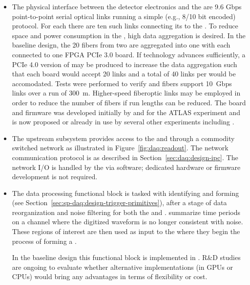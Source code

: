\begin{itemize}
  
  \item The physical interface between the detector electronics and the  are 9.6 Gbps
point-to-point serial optical links running a simple (e.g., 8/10 bit encoded) protocol.  For each
 there are ten such links connecting its  to the . To reduce space and
power consumption in the , high data aggregation is desired. In the baseline design, the
20 fibers from two  are aggregated into one  with each  connected
to one  FPGA PCIe 3.0 board.  If technology advances sufficiently, a PCIe 4.0 version of
 may be produced to increase the data aggregation such that each board would accept 20
links and a total of 40 links per  would be accomodated. Tests were performed to verify
 and  fibers support \SI{10}{Gbps} links over a run of \SI{300}{\meter}.
Higher-speed fiberoptic links may be employed in order to reduce the number of fibers if run
lengths can be reduced. The  board and firmware was developed initially by and for the
ATLAS experiment and is now proposed or already in use by several other experiments including
.
  
  \item The upstream  subsystem provides access to the
 and  through a commodity switched network as
illustrated in Figure~\ref{fig:daq:readout}. The network communication
protocol is as described in Section~\ref{sec:daq:design-ipc}. The network I/O
is handled by the  via software; dedicated hardware or firmware
development is not required.

\item The data processing functional block is tasked with identifying and forming  (see
Section~\ref{sec:sp-daq:design-trigger-primitives}), after a stage of data
reorganization and noise filtering for both the  and .  summarize time periods on a channel where the digitized waveform is no longer consistent with noise.
These regions of interest are then used as input to the  where they begin the process of forming a .

In the baseline design this functional block is implemented in .
R\&D studies are ongoing to evaluate whether alternative implementations (in GPUs or CPUs) would bring any advantages in terms of flexibility or cost.


\end{itemize}
